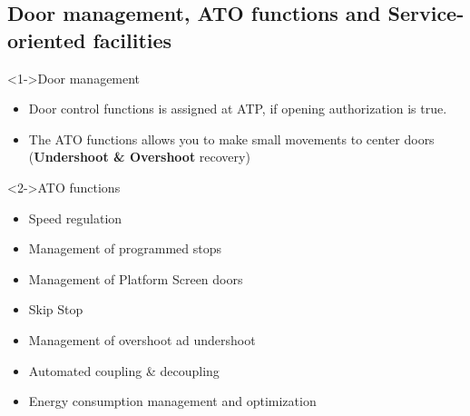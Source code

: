 
  


   




 


\subsection{Door management, ATO functions and Service-oriented facilities}
\frame
{
  

\begin{block}<1->{Door management}
\begin{itemize}
\item Door control functions is assigned at ATP, if opening authorization is true.
\item The ATO functions allows you to make small movements to center doors (\textbf{Undershoot \& Overshoot} recovery)
\end{itemize}

   \end{block}
   
   \begin{block}<2->{ATO functions}
   \begin{itemize}
\item Speed regulation
\item Management of programmed stops
\item Management of Platform Screen doors
\item Skip Stop
\item Management of overshoot ad undershoot
\item Automated coupling \& decoupling
\item Energy consumption management and optimization
\end{itemize}
   \end{block}
   
   }



